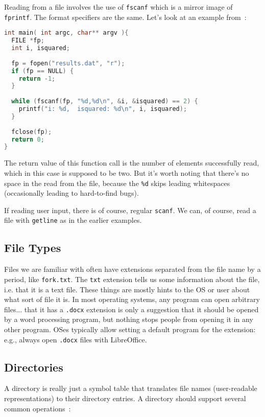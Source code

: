 Reading from a file involves the use of \texttt{fscanf} which is a mirror image of \texttt{fprintf}. The format specifiers are the same. Let's look at an example from~\cite{cfiles}:

\begin{lstlisting}[language=C]
int main( int argc, char** argv ){
  FILE *fp;
  int i, isquared;
   
  fp = fopen("results.dat", "r");
  if (fp == NULL) {
    return -1;
  }
   
  while (fscanf(fp, "%d,%d\n", &i, &isquared) == 2) {
    printf("i: %d,  isquared: %d\n", i, isquared);
  }
  
  fclose(fp);
  return 0;
}
\end{lstlisting}

The return value of this function call is the number of elements successfully read, which in this case is supposed to be two. But it's worth noting that there's no space in the read from the file, because the \texttt{\%d} skips leading whitespaces (occasionally leading to hard-to-find bugs).

If reading user input, there is of course, regular \texttt{scanf}. We can, of course, read a file with \texttt{getline} as in the earlier examples.

\subsection*{File Types}

Files we are familiar with often have extensions separated from the file name by a period, like \texttt{fork.txt}. The \texttt{txt} extension tells us some information about the file, i.e. that it is a text file. These things are mostly hints to the OS or user about what sort of file it is. In most operating systems, any program can open arbitrary files... that it has a \texttt{.docx} extension is only a suggestion that it should be opened by a word processing program, but nothing stops people from opening it in any other program. OSes typically allow setting a default program for the extension: e.g., always open \texttt{.docx} files with LibreOffice.

\subsection*{Directories}

A directory is really just a symbol table that translates file names (user-readable representations) to their directory entries. A directory should support several common operations~\cite{osc}:

